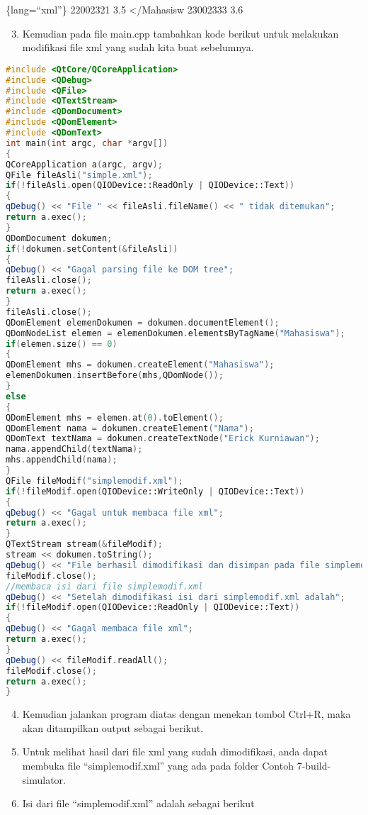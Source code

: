 \{lang=``xml''\} 22002321 3.5 \textless{}/Mahasisw 23002333 3.6

\begin{enumerate}

\setcounter{enumi}{2}

\item
  Kemudian pada file main.cpp tambahkan kode berikut untuk melakukan
  modifikasi file xml yang sudah kita buat sebelumnya.
\end{enumerate}

\begin{lstlisting}[language=c++, caption=Main program Modifikasi data dokumen XML, label=Main-program-Modifikasi-data-dokumen-XML]
#include <QtCore/QCoreApplication>
#include <QDebug>
#include <QFile>
#include <QTextStream>
#include <QDomDocument>
#include <QDomElement>
#include <QDomText>
int main(int argc, char *argv[])
{
QCoreApplication a(argc, argv);
QFile fileAsli("simple.xml");
if(!fileAsli.open(QIODevice::ReadOnly | QIODevice::Text))
{
qDebug() << "File " << fileAsli.fileName() << " tidak ditemukan";
return a.exec();
}
QDomDocument dokumen;
if(!dokumen.setContent(&fileAsli))
{
qDebug() << "Gagal parsing file ke DOM tree";
fileAsli.close();
return a.exec();
}
fileAsli.close();
QDomElement elemenDokumen = dokumen.documentElement();
QDomNodeList elemen = elemenDokumen.elementsByTagName("Mahasiswa");
if(elemen.size() == 0)
{
QDomElement mhs = dokumen.createElement("Mahasiswa");
elemenDokumen.insertBefore(mhs,QDomNode());
}
else
{
QDomElement mhs = elemen.at(0).toElement();
QDomElement nama = dokumen.createElement("Nama");
QDomText textNama = dokumen.createTextNode("Erick Kurniawan");
nama.appendChild(textNama);
mhs.appendChild(nama);
}
QFile fileModif("simplemodif.xml");
if(!fileModif.open(QIODevice::WriteOnly | QIODevice::Text))
{
qDebug() << "Gagal untuk membaca file xml";
return a.exec();
}
QTextStream stream(&fileModif);
stream << dokumen.toString();
qDebug() << "File berhasil dimodifikasi dan disimpan pada file simplemodif.xml";
fileModif.close();
//membaca isi dari file simplemodif.xml
qDebug() << "Setelah dimodifikasi isi dari simplemodif.xml adalah";
if(!fileModif.open(QIODevice::ReadOnly | QIODevice::Text))
{
qDebug() << "Gagal membaca file xml";
return a.exec();
}
qDebug() << fileModif.readAll();
fileModif.close();
return a.exec();
}
\end{lstlisting}

\begin{enumerate}

\setcounter{enumi}{3}

\item
  Kemudian jalankan program diatas dengan menekan tombol Ctrl+R, maka
  akan ditampilkan output sebagai berikut.
\item
  Untuk melihat hasil dari file xml yang sudah dimodifikasi, anda dapat
  membuka file ``simplemodif.xml'' yang ada pada folder Contoh
  7-build-simulator.
\item
  Isi dari file ``simplemodif.xml'' adalah sebagai berikut
\end{enumerate}


